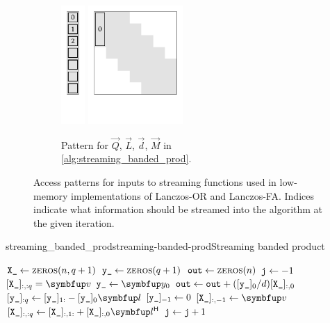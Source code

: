 \begin{figure}
\begin{subfigure}{\textwidth}
    \hfill    
    \includegraphics[height=4.5cm]{imgs/ch5_streaming_binv_d.pdf}
    \hfill
    \includegraphics[height=4.5cm]{imgs/ch5_streaming_binv_M.pdf}
    \caption{Pattern for $\vec{Q}$, $\vec{L}$, $\vec{d}$, $\vec{M}$ in \cref{alg:streaming_banded_prod}.}
    \label{fig:streaming_banded_prod}
    \end{subfigure}
    \caption{Access patterns for inputs to streaming functions used in low-memory implementations of Lanczos-OR and Lanczos-FA.
    Indices indicate what information should be streamed into the algorithm at the given iteration.}
\end{figure}


\begin{labelalgorithm}[htb]{streaming_banded_prod}{streaming-banded-prod}{Streaming banded product}
\begin{algorithmic}[1]
\State $\texttt{X\_} \gets \textsc{zeros}(n,q+1)$
\State $\texttt{y\_} \gets \textsc{zeros}(q+1)$
\State $\texttt{out} \gets \textsc{zeros}(n)$
\State $\texttt{j}\gets-1$
\State $[\ms{X\_}]_{:,:q} = \vec{v}$
\Else
{}
\State $\ms{y\_} \gets \vec{y}_0$
\EndIf
\State $\texttt{out} \gets \texttt{out} + ([\texttt{y\_}]_{0}/d)[\texttt{X\_}]_{:,0}$
\State $[\ms{y\_}]_{:q} \gets [\ms{y\_}]_{1:} - [\ms{y\_}]_{0} \vec{l}$
\State $[\texttt{y\_}]_{-1} \gets 0$
\State $[\ms{X\_}]_{:,-1} \gets \vec{v}$
\State $[\ms{X\_}]_{:,:q} \gets [\ms{X\_}]_{:,1:} + [\ms{X\_}]_{:,0} \vec{l}^\cT$
\EndIf
\State $\texttt{j}\gets \texttt{j}+1$
\EndProcedure
\EndClass
\end{algorithmic}
\end{labelalgorithm}


